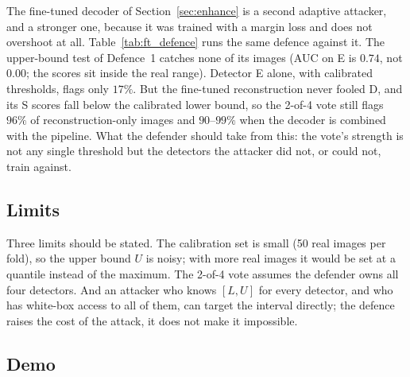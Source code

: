 \documentclass[journal]{IEEEtran}
\begin{document}
The fine-tuned decoder of Section~\ref{sec:enhance} is a second adaptive attacker, and a stronger one, because it was trained with a margin loss and does not overshoot at all. Table~\ref{tab:ft_defence} runs the same defence against it. The upper-bound test of Defence~1 catches none of its images (AUC on E is $0.74$, not $0.00$; the scores sit inside the real range). Detector E alone, with calibrated thresholds, flags only $17\%$. But the fine-tuned reconstruction never fooled D, and its S scores fall below the calibrated lower bound, so the 2-of-4 vote still flags $96\%$ of reconstruction-only images and $90$--$99\%$ when the decoder is combined with the pipeline. What the defender should take from this: the vote's strength is not any single threshold but the detectors the attacker did not, or could not, train against.



\subsection{Limits}
Three limits should be stated. The calibration set is small (50 real images per fold), so the upper bound $U$ is noisy; with more real images it would be set at a quantile instead of the maximum. The 2-of-4 vote assumes the defender owns all four detectors. And an attacker who knows $[L,U]$ for every detector, and who has white-box access to all of them, can target the interval directly; the defence raises the cost of the attack, it does not make it impossible.

\subsection{Demo}
\label{sec:defence-demo}
\end{document}
